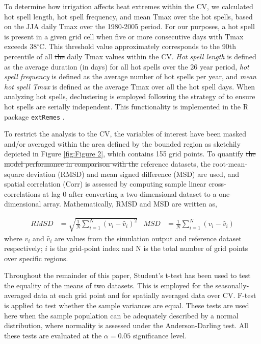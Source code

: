\documentclass[draft,ms]{agutex}   %
\providecommand{\DIFadd}[1]{{\protect\color{blue}\uwave{#1}}} %
\providecommand{\DIFdel}[1]{{\protect\color{red}\sout{#1}}}                      %
\providecommand{\DIFaddbegin}{} %
\providecommand{\DIFaddend}{} %
\providecommand{\DIFdelbegin}{} %
\providecommand{\DIFdelend}{} %
\begin{document}
\begin{article}
To determine how irrigation affects heat extremes within the CV, we calculated hot spell length, hot spell frequency, and mean Tmax over the hot spells, based on the JJA daily Tmax over the 1980-2005 period. For our purposes, a hot spell is present in a given grid cell when five or more consecutive days with Tmax exceeds 38$^\circ$C. This threshold value approximately corresponds to the 90th percentile of all \DIFdelbegin \DIFdel{the }\DIFdelend daily Tmax values within the CV. \textit{Hot spell length} is defined as the average duration (in days) for all  hot spells over the 26 year period, \textit{hot spell frequency} is defined as the average number of hot spells per year, and \textit{mean hot spell Tmax} is defined as the average Tmax over all the hot spell days. When analyzing hot spells, declustering is employed following the strategy of \cite{ferro2003inference} to ensure hot spells are serially independent.  This functionality is implemented in the R package \texttt{extRemes} \citep{gilleland2011new}.

To restrict the analysis to the CV, the variables of interest have been masked and/or averaged within the area defined by the bounded region as sketchily depicted in Figure \ref{fig:Figure 2}, which contains 155 grid points. To quantify \DIFdelbegin \DIFdel{the model performance in comparison with the }\DIFdelend \DIFaddbegin \DIFadd{model performance against }\DIFaddend reference datasets, the root-mean-square deviation (RMSD) and mean signed difference (MSD) are used, and spatial correlation (Corr) is assessed by computing sample linear cross-correlations at lag 0 after converting a two-dimensional dataset to a one-dimensional array. Mathematically, RMSD and MSD are written as, 

\begin{align}
RMSD &= \sqrt{\frac{1}{N} \sum_{i=1}^{N} (v_i - \hat{v}_i)^2}  & MSD &= \frac{1}{N} \sum_{i=1}^{N} (v_i - \hat{v}_i) 
\end{align} where $v_i$ and $\hat{v}_i$ are values from the simulation output and reference dataset respectively; $i$ is the grid-point index and N is the total number of grid points over specific regions.

Throughout the remainder of this paper, Student's t-test has been used to test the equality of the means of two datasets. This is employed for the seasonally-averaged data at each grid point and for spatially averaged data over CV. F-test is applied to test whether the sample variances are equal. These tests are used here when the sample population can be adequately described by a normal distribution, where normality is assessed under the Anderson-Darling test. All these tests are evaluated at the $\alpha = 0.05$ significance level. 


\end{article}
\end{document}
